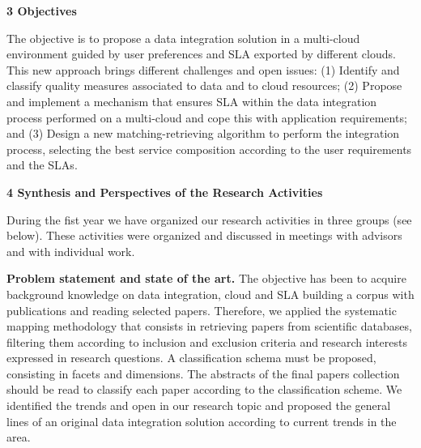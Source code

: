 \documentclass[11pt,a4paper,oneside]{report}
\begin{document}

\begin{flushleft}
\textbf{3 Objectives}\\
\end{flushleft}
The  objective is to propose a data integration solution in a multi-cloud environment guided by user preferences and SLA exported by different clouds. This new approach brings different challenges and open issues: (1)  Identify and classify quality measures associated to data and to cloud resources; (2) Propose and implement a mechanism that ensures SLA within the data integration process  performed on a multi-cloud and cope this with application requirements; and (3) Design a new matching-retrieving algorithm to perform the integration process, selecting the best service composition according to the user requirements and the SLAs.


 
\begin{flushleft}
\textbf{4 Synthesis and Perspectives of the Research Activities}\\
\end{flushleft}
During the fist year we have organized our research activities  in three groups (see below). These activities were organized and discussed in meetings with advisors and with individual work.
%

\noindent
\textbf{Problem statement and state of the art.} The objective has been to acquire background knowledge on data integration, cloud and SLA building a corpus with publications  and reading selected papers. Therefore, we applied the systematic mapping methodology that consists in retrieving papers from scientific databases,   filtering them according to inclusion and exclusion criteria and research interests expressed in research questions. A classification schema must be proposed, consisting in   facets and dimensions. The abstracts of the final papers collection should be read  to classify each paper according to the classification scheme.  We identified the trends and open in our research topic and proposed the general lines of  an original data integration solution according to current trends in the area.
\end{document}
